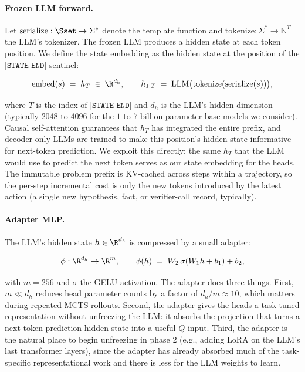 \paragraph{Frozen LLM forward.}
Let $\mathrm{serialize}: \Sset \to \Sigma^{*}$ denote the template
function and $\mathrm{tokenize}: \Sigma^{*} \to \mathbb{N}^{T}$ the
LLM's tokenizer. The frozen LLM produces a hidden state at each token
position. We define the state embedding as the hidden state at the
position of the $\texttt{[STATE\_END]}$ sentinel:

\begin{equation}
\label{eq:embed}
\mathrm{embed}(s) \;=\; h_{T} \;\in\; \R^{d_h},
\qquad
h_{1{:}T} \;=\; \mathrm{LLM}\bigl(\mathrm{tokenize}(\mathrm{serialize}(s))\bigr),
\end{equation}

where $T$ is the index of $\texttt{[STATE\_END]}$ and $d_h$ is the LLM's
hidden dimension (typically $2048$ to $4096$ for the $1$-to-$7$ billion
parameter base models we consider). Causal self-attention guarantees
that $h_{T}$ has integrated the entire prefix, and decoder-only LLMs
are trained to make this position's hidden state informative for
next-token prediction. We exploit this directly: the same $h_{T}$ that
the LLM would use to predict the next token serves as our state
embedding for the heads. The immutable problem prefix is KV-cached
across steps within a trajectory, so the per-step incremental cost is
only the new tokens introduced by the latest action (a single new
hypothesis, fact, or verifier-call record, typically).

\paragraph{Adapter MLP.}
The LLM's hidden state $h \in \R^{d_h}$ is compressed by a small adapter:

\begin{equation}
\label{eq:adapter}
\phi: \R^{d_h} \to \R^{m},
\qquad
\phi(h) \;=\; W_{2}\,\sigma(W_{1} h + b_{1}) + b_{2},
\end{equation}

with $m = 256$ and $\sigma$ the GELU activation. The adapter does three
things. First, $m \ll d_h$ reduces head parameter counts by a factor of
$d_h / m \approx 10$, which matters during repeated MCTS rollouts. Second,
the adapter gives the heads a task-tuned representation without
unfreezing the LLM: it absorbs the projection that turns a
next-token-prediction hidden state into a useful $Q$-input. Third, the
adapter is the natural place to begin unfreezing in phase 2 (e.g.,
adding LoRA \citep{hu2022lora} on the LLM's last transformer layers),
since the adapter has already absorbed much of the task-specific
representational work and there is less for the LLM weights to learn.


